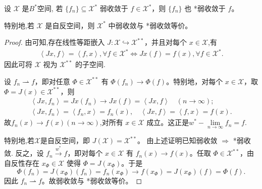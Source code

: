 \documentclass[../../main.tex]{subfiles}%
\begin{document}
\begin{proposition}\label{proposition:共轭空间上的弱收敛可推出星弱收敛}
设 $\mathscr{X}$ 是$B^*$空间,
若 $\{f_n\} \subseteq \mathscr{X}^*$ 弱收敛于 $f \in \mathscr{X}^*$，则 $\{f_n\}$ 也 *弱收敛于 $f$。

特别地,若 $\mathscr{X}$ 是自反空间，则 $\mathscr{X}^*$ 中弱收敛与 *弱收敛等价。
\end{proposition}
\begin{proof}

由可知,存在线性等距嵌入 $J: \mathscr{X} \hookrightarrow \mathscr{X}^{**}$，并且对每个 $x \in \mathscr{X}$,有
\begin{align*}
\left< Jx,f \right> =\left< f,x \right> ,\forall f\in\mathscr{X}^*\iff Jx\left( f \right) =f\left( x \right) ,\forall f\in \mathscr{X} ^*.
\end{align*}
因此可将 $\mathscr{X}$ 视为 $\mathscr{X}^{**}$ 的子空间.
 
设 $f_n \rightharpoonup f$，即对任意 $\Phi \in \mathscr{X}^{**}$ 有 $\Phi(f_n) \to \Phi(f)$。特别地，对每个 $x \in \mathscr{X}$，取 $\Phi = J(x) \in \mathscr{X}^{**}$，则
\begin{gather*}
\left< Jx,f_n \right> =Jx\left( f_n \right) \rightarrow Jx\left( f \right) =\left< Jx,f \right> \quad \left( n\rightarrow \infty \right) ;
\\
\left< Jx,f_n \right> =\left< f_n,x \right> =f_n\left( x \right) ,\quad \left< Jx,f \right> =\left< f,x \right> =f\left( x \right) .
\end{gather*}
故$f_n(x)\to f(x)(n\to \infty)$,对所有 $x\in\mathscr{X}$ 成立。这正是$w^*-\lim\limits_{n\to\infty}f_n=f$.

特别地,若$\mathscr{X}$是自反空间，即 $J(\mathscr{X}) = \mathscr{X}^{**}$。  
由上述证明已知弱收敛 $\Rightarrow$ *弱收敛.
反之，设 $f_n \xrightarrow{w^*} f$，即对每个 $x\in\mathscr{X}$ 有 $f_n(x) \to f(x)$。任取 $\Phi \in \mathscr{X}^{**}$，由自反性存在 $x_\Phi \in \mathscr{X}$ 使得 $\Phi = J(x_\Phi)$。于是
\[
\Phi(f_n) = J(x_\Phi)(f_n) = f_n(x_\Phi) \to f(x_\Phi) = J(x_\Phi)(f) = \Phi(f).
\]
因此 $f_n \rightharpoonup f$。故弱收敛与 *弱收敛等价。
\end{proof}
\end{document}
